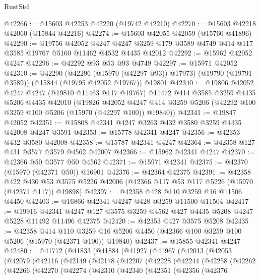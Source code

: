 \begin{lexlean}{RustStd}
\begin{coremodule}
@42266 := @15603 @42253 @42220 (@19742 @42210)
@42270 := @15603 @42218 @42060 (@15844 @42216)
@42274 := @15603 @42055 @42059 (@15760 @41896)
@42290 := @19756
    @42052
    @4247
    @4247
    @3259
    @179
    @3589
    @4749
    @414
    @117
    @3585
    @19767
    @5160
    @11462
    @4532
    @4435
    @42012
@42292 := @15962 @42052 @4247
@42296 := @42292 @93 @53 @93 @4749
@42297 := @15971 @42052
@42310 := @42290
    (@42296 (@15970 (@42297 @93)) @17973)
    (@19790 (@19791 @3589))
    (@15844 (@19795 @42052 @19767))
    @19801
@42340 := @19806
    @42052
    @4247
    @4247
    (@19810 @11463 @117 @19767)
    @11472
    @414
    @3585
    @3259
    @4435
    @5206
    @4435
    @42010
    (@19826
      @42052
      @4247
      @414
      @3259
      @5206
      (@42292 @100 @3259 @100 @5206 (@15970 (@42297 @100)) @19840))
@42341 := @19847 @42052
@42351 := @15808 @42341 @4247 @3263 @432 @3580 @3259 @4435 @42008 @4247 @3591
@42353 := @15778 @42341 @4247
@42356 := @42353 @432 @3580 @42008
@42358 := @15787 @42341 @4247
@42364 := @42358 @127 @431 @3577 @3579 @4562 @42007
@42366 := @15962 @42341 @4247
@42370 := @42366 @50 @3577 @50 @4562
@42371 := @15971 @42341
@42375 := @42370 (@15970 (@42371 @50)) @16901
@42376 := @42364 @42375
@42391 := @42358
    @422
    @430
    @53
    @3575
    @5226
    @42006
    (@42366 @117 @53 @117 @5226 (@15970 (@42371 @117)) @19898)
@42397 := @42358 @428 @110 @3259 @16 @11506 @4450
@42403 := @16866 @42341 @4247 @428 @3259 @11500 @11504
@42417 := @19916
    @42341
    @4247
    @127
    @3575
    @3259
    @4562
    @427
    @4435
    @5208
    @4247
    @5228
    @11492
    @11496
    @42375
@42420 := @42353 @427 @3575 @5208
@42435 := @42358
    @414
    @110
    @3259
    @16
    @5206
    @4450
    (@42366 @100 @3259 @100 @5206 (@15970 (@42371 @100)) @19840)
@42437 := @15855 @42341 @4247
@42480 := @41772
    (@41833
      (@41884
        (@41927
          (@41967
            (@42013
              (@42053
                (@42079
                  (@42116
                    (@42149
                      (@42178
                        (@42207
                          (@42228
                            (@42244
                              (@42258
                                (@42262
                                  (@42266
                                    (@42270
                                      (@42274
                                        (@42310
                                          (@42340
                                            (@42351
                                              (@42356
                                                (@42376

\end{coremodule}
\end{lexlean}
